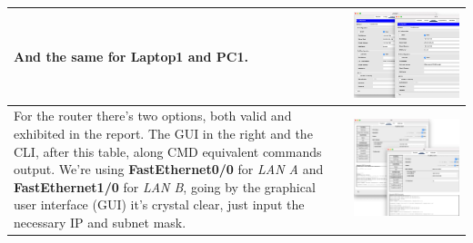 \documentclass[11pt,a4paper]{report}
\begin{document}
\begin{flushleft}
\begin{center}
\begin{longtable}{ m{5cm} l }
                        And the same for Laptop1 and PC1.                                                                                                                                                                                                                                                                                                                                                           & \includegraphics[scale=0.34 ,valign=c]{p2-connecting2lanswithrouter/Laptop1PC1_ip}        \\ \hline
                        For the router there's two options, both valid and exhibited in the report. The GUI in the right and the CLI, after this table, along CMD equivalent commands output. We're using \textbf{FastEthernet0/0} for \textit{LAN A} and \textbf{FastEthernet1/0} for \textit{LAN B}, going by the graphical user interface (GUI) it's crystal clear, just input the necessary IP and subnet mask. & \includegraphics[scale=0.31 ,valign=c]{p2-connecting2lanswithrouter/R1-interfaces}        \\ \hline

\end{longtable}
\end{center}
\end{flushleft}
\end{document}
